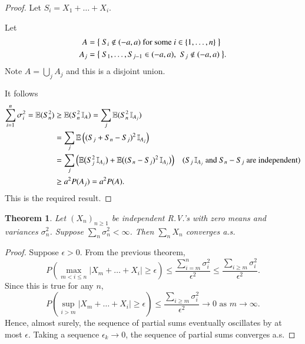 \documentclass[a4paper]{amsart}
\theoremstyle{plain}
\newtheorem{theorem}{Theorem}[section]
\theoremstyle{definition}
\theoremstyle{remark}
\begin{document}
\begin{proof} Let $ S_i = X_1 +  \dots + X_i $.

Let
\begin{align*}
A &= \big\{\text{ $ S_i \notin (-a,a) $ for some $ i \in \{1,\dots, n \} $ }\big\} \\
A_j &= \big\{\text{ $ S_1,\dots, S_{j-1} \in (-a,a) $, \     $ S_j \notin (-a,a) $ }\big\}.
\end{align*} 
Note $ A = \bigcup_j A_j $ and this is a disjoint union.

It follows
\begin{align*}
\sum_{i=1}^n \sigma _i ^2  = \mathbb{E} (S_n^2) &\geq \mathbb{E} (S_n^2 \, \mathbb{I}_A)  
    = \sum_j \mathbb{E}  (S_n^2\,  \mathbb{I}_{A_j})  \\
   &= \sum_j \mathbb{E} \left( (S_j + S_n-S_j)^2\,  \mathbb{I}_{A_j}\right)  \\
   &= \sum_j \Big( \mathbb{E} \big(S_j^2\, \mathbb{I}_{A_j}\big) + \mathbb{E}\big( (S_n - S_j)^2 \, \mathbb{I}_{A_j}\big) \Big)
      \quad \text{($ S_j \, \mathbb{I}_{A_j}$ and $ S_n - S_j $ are independent)} \\
      &\geq a^2 P(A_j)  
       = a^2 P(A) . 
\end{align*}  
This is the required result.
\end{proof} 
 

 \begin{theorem} \label{kmia} Let $ (X_n)_{n\geq 1}   $ be independent R.V.'s with zero means and variances $ \sigma _n^2 $.  Suppose $ \sum_n \sigma ^2_n < \infty $.  Then
 $   \sum_n X_n $ converges a.s.
 \end{theorem}

\begin{proof}
Suppose $ \epsilon > 0 $. From the previous theorem, 
\[
P \left( \max_{m< i \leq n} |X_m+\dots+ X_i | \geq \epsilon  \right) 
      \leq \frac { \sum_{i=m }^n \sigma _i^2 } { \epsilon ^2 }  \leq \frac { \sum_{i\geq m }  \sigma _i^2 } { \epsilon ^2 }      .%
\]
 Since this is true for any $ n $,
 \[
P \left( \sup_{  i >m} |X_m+\dots+ X_i | \geq \epsilon  \right) 
      \leq \frac { \sum_{i\geq m }  \sigma _i^2 } { \epsilon ^2 } \to 0 \text{ as } m \to \infty.
\]
Hence, almost surely, the sequence of partial sums  eventually oscillates by at most $ \epsilon $.  Taking a sequence $ \epsilon _k \to 0 $,  the sequence of partial sums converges a.s.
    \end{proof}  
 
 
\end{document}
